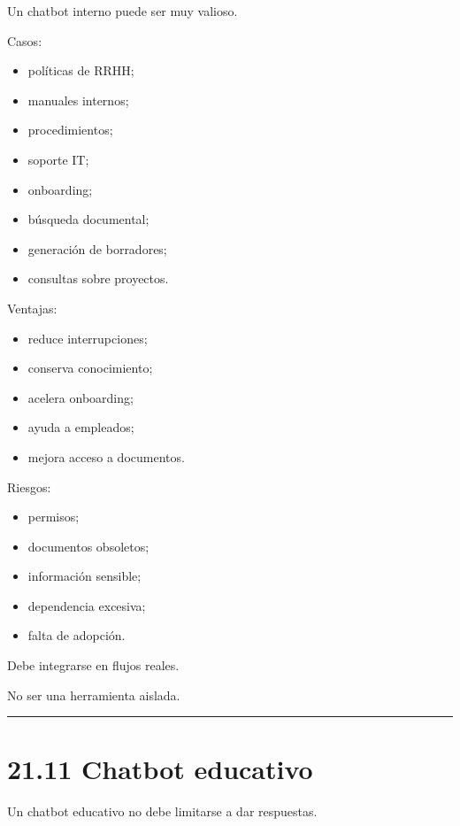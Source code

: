 Un chatbot interno puede ser muy valioso.

Casos:

\begin{itemize}
\tightlist
\item
  políticas de RRHH;
\item
  manuales internos;
\item
  procedimientos;
\item
  soporte IT;
\item
  onboarding;
\item
  búsqueda documental;
\item
  generación de borradores;
\item
  consultas sobre proyectos.
\end{itemize}

Ventajas:

\begin{itemize}
\tightlist
\item
  reduce interrupciones;
\item
  conserva conocimiento;
\item
  acelera onboarding;
\item
  ayuda a empleados;
\item
  mejora acceso a documentos.
\end{itemize}

Riesgos:

\begin{itemize}
\tightlist
\item
  permisos;
\item
  documentos obsoletos;
\item
  información sensible;
\item
  dependencia excesiva;
\item
  falta de adopción.
\end{itemize}

Debe integrarse en flujos reales.

No ser una herramienta aislada.

\begin{center}\rule{0.5\linewidth}{0.5pt}\end{center}

\section{21.11 Chatbot educativo}\label{chatbot-educativo-1}

Un chatbot educativo no debe limitarse a dar respuestas.

